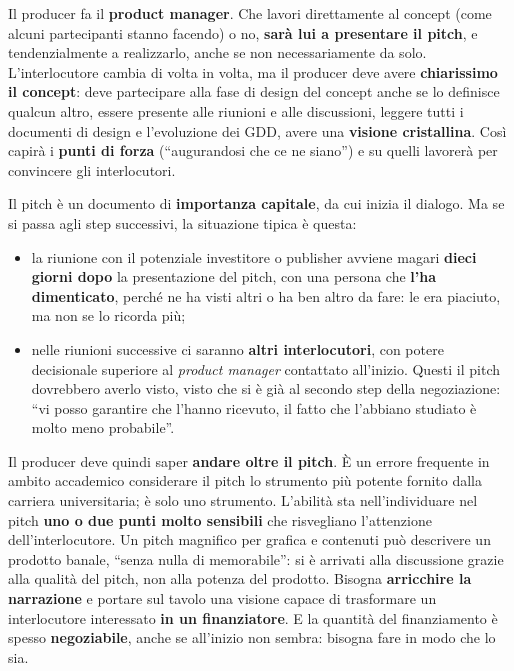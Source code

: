Il producer fa il \textbf{product manager}. Che lavori direttamente al concept
(come alcuni partecipanti stanno facendo) o no, \textbf{sarà lui a presentare il
pitch}, e tendenzialmente a realizzarlo, anche se non necessariamente da solo.
L'interlocutore cambia di volta in volta, ma il producer deve avere
\textbf{chiarissimo il concept}: deve partecipare alla fase di design del
concept anche se lo definisce qualcun altro, essere presente alle riunioni e
alle discussioni, leggere tutti i documenti di design e l'evoluzione dei GDD,
avere una \textbf{visione cristallina}. Così capirà i \textbf{punti di forza}
(``augurandosi che ce ne siano'') e su quelli lavorerà per convincere gli
interlocutori.

Il pitch è un documento di \textbf{importanza capitale}, da cui inizia il
dialogo. Ma se si passa agli step successivi, la situazione tipica è questa:
\begin{itemize}
  \item la riunione con il potenziale investitore o publisher avviene magari
        \textbf{dieci giorni dopo} la presentazione del pitch, con una persona
        che \textbf{l'ha dimenticato}, perché ne ha visti altri o ha ben altro
        da fare: le era piaciuto, ma non se lo ricorda più;
  \item nelle riunioni successive ci saranno \textbf{altri interlocutori}, con
        potere decisionale superiore al \emph{product manager} contattato
        all'inizio. Questi il pitch dovrebbero averlo visto, visto che si è già
        al secondo step della negoziazione: ``vi posso garantire che l'hanno
        ricevuto, il fatto che l'abbiano studiato è molto meno probabile''.
\end{itemize}
Il producer deve quindi saper \textbf{andare oltre il pitch}. È un errore
frequente in ambito accademico considerare il pitch lo strumento più potente
fornito dalla carriera universitaria; è solo uno strumento. L'abilità sta
nell'individuare nel pitch \textbf{uno o due punti molto sensibili} che
risvegliano l'attenzione dell'interlocutore. Un pitch magnifico per grafica e
contenuti può descrivere un prodotto banale, ``senza nulla di memorabile'': si è
arrivati alla discussione grazie alla qualità del pitch, non alla potenza del
prodotto. Bisogna \textbf{arricchire la narrazione} e portare sul tavolo una
visione capace di trasformare un interlocutore interessato \textbf{in un
finanziatore}. E la quantità del finanziamento è spesso \textbf{negoziabile},
anche se all'inizio non sembra: bisogna fare in modo che lo sia.


